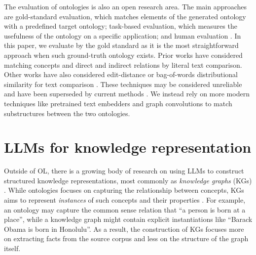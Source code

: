 The evaluation of ontologies is also an open research area. The main approaches are gold-standard evaluation, which matches elements of the generated ontology with a predefined target ontology; task-based evaluation, which measures the usefulness of the ontology on a specific application; and human evaluation \cite{raad2015survey,brank2005survey}. In this paper, we evaluate by the gold standard as it is the most straightforward approach when such ground-truth ontology exists. Prior works have considered matching concepts \cite{maedche2002measuring} and direct and indirect relations \cite{Kashyap2005TaxaMinerAE, Treeratpituk2013GraphbasedAT} by literal text comparison. Other works have also considered edit-distance \cite{Ehrig2005SimilarityFO} or bag-of-words distributional similarity for text comparison \cite{Zavitsanos2011GoldSE}.  These techniques may be considered unreliable and have been superseded by current methods \cite{conneau2017supervised}. We instead rely on more modern techniques like pretrained text embedders \cite{devlin2018bert} and graph convolutions \cite{kipf2016semi} to match substructures between the two ontologies.

\section{LLMs for knowledge representation}

Outside of OL, there is a growing body of research on using LLMs to construct structured knowledge representations, most commonly as \emph{knowledge graphs} (KGs) \cite{singhal2012introducing}. While ontologies focuses on capturing the relationship between concepts, KGs aims to represent \emph{instances} of such concepts and their properties \cite{guarino1995ontologies}. For example, an ontology may capture the common sense relation that ``a person is born at a place'', while a knowledge graph might contain explicit instantiations like ``Barack Obama is born in Honolulu''. As a result, the construction of KGs focuses more on extracting facts from the source corpus and less on the structure of the graph itself.

